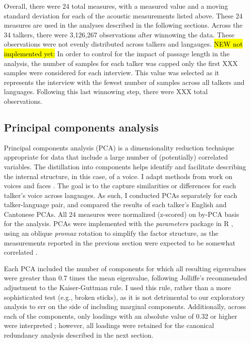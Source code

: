 Overall, there were 24 total measures, with a measured value and a moving standard deviation for each of the acoustic measurements listed above. These 24 measures are used in the analyses described in the following sections. Across the 34 talkers, there were 3,126,267 observations after winnowing the data. These observations were not evenly distributed across talkers and langauges. \hl{NEW not implemented yet:} In order to control for the impact of passage length in the analysis, the number of samples for each talker was capped only the first XXX samples were considered for each interview. This value was selected as it represents the interview with the fewest number of samples across all talkers and languages. Following this last winnowing step, there were XXX total observations. 

\subsection{Principal components analysis}\label{ch3:sec:pca}

Principal components analysis (PCA) is a dimensionality reduction technique appropriate for data that include a large number of (potentially) correlated variables. The distillation into components helps identify and facilitate describing the internal structure, in this case, of a voice. I adapt methods from work on voices \citep{lee_2019_acoustic} and faces \citep{burton_2016_faces,turk_1991_eigenfaces}. The goal is to the capture similarities or differences for each talker's voice across languages. As such, I conducted PCAs separately for each talker-language pair, and compared the results of each talker's English and Cantonese PCAs. All 24 measures were normalized (z-scored) on by-PCA basis for the analysis. PCAs were implemented with the \textit{parameters} package \citep{makowski_2019_parameters} in R \citep{r_2021}, using an oblique \textit{promax} rotation to simplify the factor structure, as the measurements reported in the previous section were expected to be somewhat correlated \citep{lee_2019_acoustic}.

Each PCA included the number of components for which all resulting eigenvalues were greater than 0.7 times the mean eigenvalue, following Jolliffe's \citep{jolliffe_2002_pca} recommended adjustment to the Kaiser-Guttman rule. I used this rule, rather than a more sophisticated test (e.g., broken sticks), as it is not detrimental to our exploratory analysis to err on the side of including marginal components. Additionally, across each of the components, only loadings with an absolute value of 0.32 or higher were interpreted \citep{lee_2019_acoustic,tabachnick_2013_statistics}; however, all loadings were retained for the canonical redundancy analysis described in the next section.


